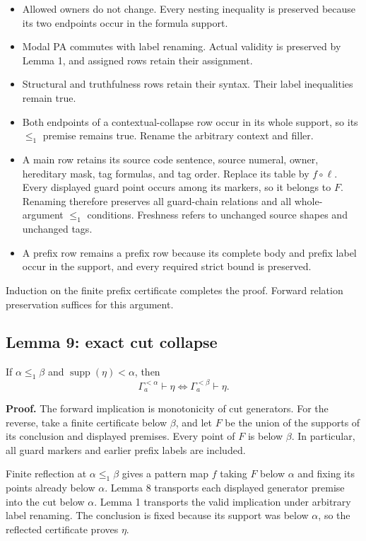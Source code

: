 \documentclass[
  11pt,
  letterpaper,
]{article}
\providecommand{\tightlist}{%
  \setlength{\itemsep}{0pt}\setlength{\parskip}{0pt}}
\begin{document}
\begin{itemize}
\tightlist
\item
  Allowed owners do not change. Every nesting inequality is preserved
  because its two endpoints occur in the formula support.
\item
  Modal PA commutes with label renaming. Actual validity is preserved by
  Lemma 1, and assigned rows retain their assignment.
\item
  Structural and truthfulness rows retain their syntax. Their label
  inequalities remain true.
\item
  Both endpoints of a contextual-collapse row occur in its whole
  support, so its \(\leq_1\) premise remains true. Rename the arbitrary
  context and filler.
\item
  A main row retains its source code sentence, source numeral, owner,
  hereditary mask, tag formulas, and tag order. Replace its table by
  \(f\circ\ell\). Every displayed guard point occurs among its markers,
  so it belongs to \(F\). Renaming therefore preserves all guard-chain
  relations and all whole-argument \(\leq_1\) conditions. Freshness
  refers to unchanged source shapes and unchanged tags.
\item
  A prefix row remains a prefix row because its complete body and prefix
  label occur in the support, and every required strict bound is
  preserved.
\end{itemize}

Induction on the finite prefix certificate completes the proof. Forward
relation preservation suffices for this argument.

\subsection{Lemma 9: exact cut
collapse}\label{lemma-9-exact-cut-collapse}

If \(\alpha\leq_1\beta\) and \(\operatorname{supp}(\eta)<\alpha\), then
\[
\Gamma_a^{<\alpha}\vdash\eta
\iff
\Gamma_a^{<\beta}\vdash\eta.
\tag{2}
\]

\textbf{Proof.} The forward implication is monotonicity of cut
generators. For the reverse, take a finite certificate below \(\beta\),
and let \(F\) be the union of the supports of its conclusion and
displayed premises. Every point of \(F\) is below \(\beta\). In
particular, all guard markers and earlier prefix labels are included.

Finite reflection at \(\alpha\leq_1\beta\) gives a pattern map \(f\)
taking \(F\) below \(\alpha\) and fixing its points already below
\(\alpha\). Lemma 8 transports each displayed generator premise into the
cut below \(\alpha\). Lemma 1 transports the valid implication under
arbitrary label renaming. The conclusion is fixed because its support
was below \(\alpha\), so the reflected certificate proves \(\eta\).
\end{document}
